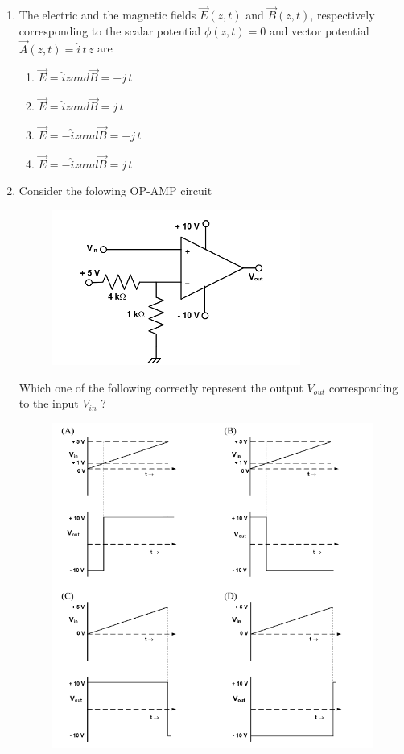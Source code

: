 \documentclass[journal,12pt,onecolumn]{IEEEtran}
\theoremstyle{remark}
\begin{document}
\begin{enumerate}
\item The electric and the magnetic fields $\vec{E}(z,t)$ and $\vec{B}(z,t)$, respectively corresponding to the scalar potential $\phi(z,t)=0$ and vector potential $\vec{A}(z,t)=\hat{i}\,t\,z$ are
\begin{multicols}{2}
\begin{enumerate}
\item $\vec{E} = \hat{i}z and \vec{B} = -j\,t$
\item $\vec{E} = \hat{i}z and \vec{B} = j\,t$
\item $\vec{E} = -\hat{i}z and \vec{B} = -j\,t$
\item $\vec{E} = -\hat{i}z and  \vec{B} = j\,t$
\end{enumerate}
\end{multicols}
\item Consider the folowing OP-AMP circuit
\begin{figure}[H]
    \centering
    \includegraphics[width = 0.5\columnwidth]{fig/Q20(1).png}
    \caption*{}
    \label{fig:Q20(1)}
\end{figure}
Which one of the following correctly represent the output $V_{out}$
 corresponding to the input  $V_{in}$ ?
 \begin{figure}[H]
    \centering
    \includegraphics[width = 0.7\columnwidth]{fig/Q20(2).png}

\end{figure}
\end{enumerate}
\end{document}
